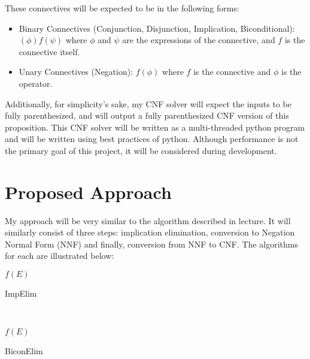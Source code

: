 \documentclass[12pt]{report}
\begin{document}
\noindent These connectives will be expected to be in the following forms:

\begin{itemize}
    \item Binary Connectives (Conjunction, Disjunction, Implication, Biconditional): $(\phi) f (\psi)$ where $\phi$ and $\psi$ are the expressions of the connective, and $f$ is the connective itself.
    \item Unary Connectives (Negation): $f (\phi)$ where $f$ is the connective and $\phi$ is the operator.
\end{itemize}

\noindent Additionally, for simplicity's sake, my CNF solver will expect the inputs to be fully parenthesized, and will output a fully parenthesized CNF version of this proposition. This CNF solver will be written as a multi-threaded python program and will be written using best practices of python. Although performance is not the primary goal of this project, it will be considered during development.

\section*{Proposed Approach}
My approach will be very similar to the algorithm described in lecture. It will similarly consist of three steps: implication elimination, conversion to Negation Normal Form (NNF) and finally, conversion from NNF to CNF. The algorithms for each are illustrated below: \\

\begin{algorithm}[H]

\KwRet $f(E)$
\caption{ImpElim}
\end{algorithm}\\

\begin{algorithm}[H]

\KwRet $f(E)$
\caption{BiconElim}
\end{algorithm}
\end{document}
